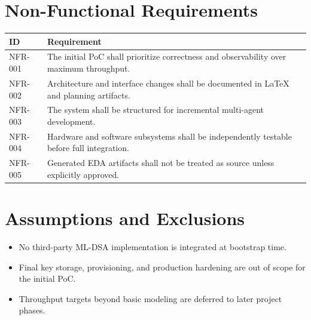 \section{Non-Functional Requirements}
\begin{longtable}{p{} p{}}
\toprule
ID & Requirement \\
\midrule
NFR-001 & The initial PoC shall prioritize correctness and observability over maximum throughput. \\
NFR-002 & Architecture and interface changes shall be documented in LaTeX and planning artifacts. \\
NFR-003 & The system shall be structured for incremental multi-agent development. \\
NFR-004 & Hardware and software subsystems shall be independently testable before full integration. \\
NFR-005 & Generated EDA artifacts shall not be treated as source unless explicitly approved. \\
\bottomrule
\end{longtable}

\section{Assumptions and Exclusions}
\begin{itemize}[leftmargin=*]
  \item No third-party ML-DSA implementation is integrated at bootstrap time.
  \item Final key storage, provisioning, and production hardening are out of scope for the initial PoC.
  \item Throughput targets beyond basic modeling are deferred to later project phases.
\end{itemize}
